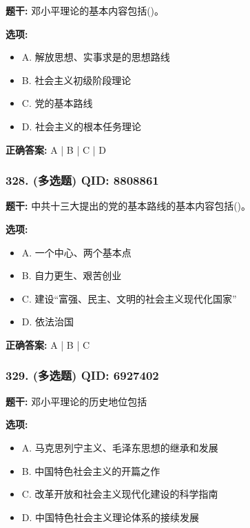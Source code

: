 \documentclass[12pt,UTF8]{ctexart}
\begin{document}
\textbf{题干:}
邓小平理论的基本内容包括()。

\textbf{选项:}
\begin{itemize}[leftmargin=*]

  \item A. 解放思想、实事求是的思想路线

  \item B. 社会主义初级阶段理论

  \item C. 党的基本路线

  \item D. 社会主义的根本任务理论

\end{itemize}

\textbf{正确答案:}
A | B | C | D

\vspace{0.3em}\hrulefill\vspace{0.7em}

\subsubsection*{328. (多选题) \small QID: 8808861}

\textbf{题干:}
中共十三大提出的党的基本路线的基本内容包括()。

\textbf{选项:}
\begin{itemize}[leftmargin=*]

  \item A. 一个中心、两个基本点

  \item B. 自力更生、艰苦创业

  \item C. 建设“富强、民主、文明的社会主义现代化国家”

  \item D. 依法治国

\end{itemize}

\textbf{正确答案:}
A | B | C

\vspace{0.3em}\hrulefill\vspace{0.7em}

\subsubsection*{329. (多选题) \small QID: 6927402}

\textbf{题干:}
邓小平理论的历史地位包括

\textbf{选项:}
\begin{itemize}[leftmargin=*]

  \item A. 马克思列宁主义、毛泽东思想的继承和发展

  \item B. 中国特色社会主义的开篇之作

  \item C. 改革开放和社会主义现代化建设的科学指南

  \item D. 中国特色社会主义理论体系的接续发展

\end{itemize}
\end{document}
